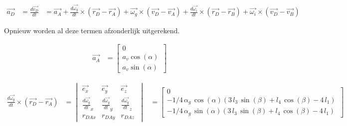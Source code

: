 \begin{equation*}
\begin{split}
\overrightarrow{a_{D}}&=\frac{d\overrightarrow{v_{D}}}{dt}
&=	\overrightarrow{a_{A}} + \frac{d\overrightarrow{\omega_{g}}}{dt}\times(\overrightarrow{r_{D}}-\overrightarrow{r_{A}}) + \overrightarrow{\omega_{g}}\times(\overrightarrow{v_{D}}-\overrightarrow{v_{A}}) + \frac{d\overrightarrow{\omega_i}}{dt}\times(\overrightarrow{r_{D}}-\overrightarrow{r_{B}})+\overrightarrow{\omega_{i}}\times(\overrightarrow{v_{D}}-\overrightarrow{v_{B}})
\end{split}
\end{equation*}

Opnieuw worden al deze termen afzonderlijk uitgerekend.

\begin{equation*}
\begin{split}
\overrightarrow{a_{A}}
&=	\begin{bmatrix}
	0\\
	a_v\cos(\alpha)\\
	a_v\sin(\alpha)\
	\end{bmatrix}
\end{split}
\end{equation*}

\begin{equation*}
\begin{split}
\frac{d\overrightarrow{\omega_{g}}}{dt}\times(\overrightarrow{r_{D}}-\overrightarrow{r_{A}})
&=	\begin{vmatrix}
	\overrightarrow{e_{x}} & \overrightarrow{e_{y}} & \overrightarrow{e_{z}}\\
	\frac{d\overrightarrow{\omega_g}}{dt}_{x} & \frac{d\overrightarrow{\omega_g}}{dt}_{y} & \frac{d\overrightarrow{\omega_g}}{dt}_{z}\\
	r_{DAx} & r_{DAy} & r_{DAz}\
	\end{vmatrix}
&=	\begin{bmatrix}
	0\\
	-1/4\,\alpha_{g}\,\cos\left( \alpha \right)  \left( 3\,l_{3}\,\sin \left( \beta \right) +l_{4}\,\cos \left( \beta \right) -4\,l_{1} \right) \\
	-1/4\,\alpha_{g}\,\sin \left( \alpha \right)  \left( 3\,l_{3}\,\sin\left( \beta \right) +l_{4}\,\cos \left( \beta \right) -4\,l_{1}\right) \
	\end{bmatrix}
\end{split}
\end{equation*}

